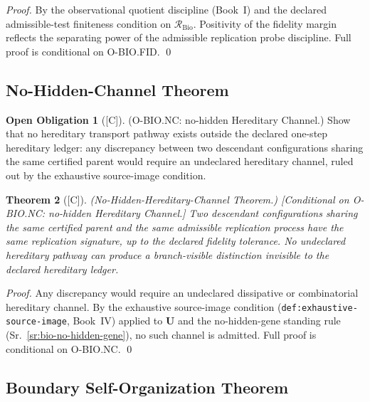 \documentclass[12pt,oneside]{amsbook}
\theoremstyle{plain}
\newtheorem{theorem}{Theorem}[section]
\theoremstyle{definition}
\newtheorem{obligation}[theorem]{Open Obligation}
\theoremstyle{remark}
\newcommand{\status}[1]{\textup{[#1]}}
\begin{document}
\begin{proof}
By the observational quotient discipline (Book~I) and the declared
admissible-test finiteness condition on $\mathcal{R}_{\mathrm{Bio}}$.
Positivity of the fidelity margin reflects the separating power of the
admissible replication probe discipline. Full proof is conditional on
O-BIO.FID.
\qed
\end{proof}

\subsection{No-Hidden-Channel Theorem}\label{sec:bio-NC}

\begin{obligation}[\status{C}]\label{ob:bio-NC}
\textup{(O-BIO.NC: no-hidden Hereditary Channel.)}
Show that no hereditary transport pathway exists outside the declared
one-step hereditary ledger: any discrepancy between two descendant
configurations sharing the same certified parent would require an
undeclared hereditary channel, ruled out by the exhaustive
source-image condition.
\end{obligation}

\begin{theorem}[\status{C}]\label{thm:bio-no-hidden-channel}
\textup{(No-Hidden-Hereditary-Channel Theorem.)}
\textup{[Conditional on O-BIO.NC: no-hidden Hereditary Channel.]}
Two descendant configurations sharing the same certified parent and
the same admissible replication process have the same replication
signature, up to the declared fidelity tolerance. No undeclared
hereditary pathway can produce a branch-visible distinction invisible
to the declared hereditary ledger.
\end{theorem}

\begin{proof}
Any discrepancy would require an undeclared dissipative or
combinatorial hereditary channel. By the exhaustive source-image
condition (\texttt{def:exhaustive-source-image}, Book~IV) applied to
$\mathbf{U}$ and the no-hidden-gene standing rule
(Sr.~\ref{sr:bio-no-hidden-gene}), no such channel is admitted.
Full proof is conditional on O-BIO.NC.
\qed
\end{proof}

\subsection{Boundary Self-Organization Theorem}\label{sec:bio-BND}
\end{document}
